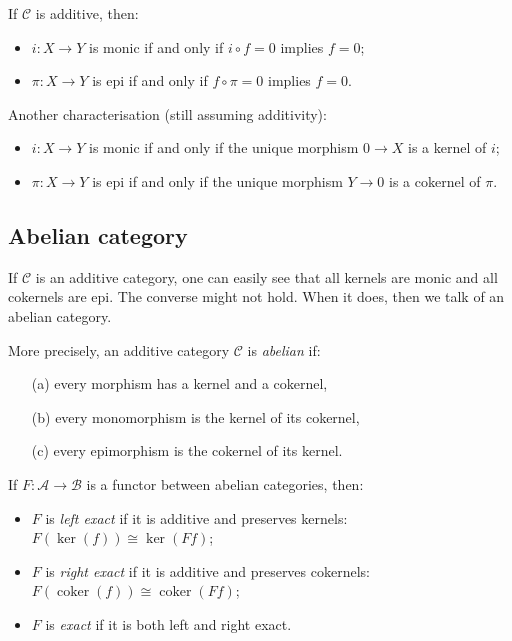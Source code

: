 \documentclass[11pt]{article}
\theoremstyle{definition}
\begin{document}
If \( \mathcal{C} \) is additive, then:
\begin{itemize}
  \item \( i: X \to Y \) is monic if and only if \( i \circ f = 0 \) implies \( f = 0 \);
  \item \( \pi: X \to Y \) is epi if and only if \( f \circ \pi = 0 \) implies \( f = 0 \).
\end{itemize}

Another characterisation (still assuming additivity):
\begin{itemize}
  \item \( i: X \to Y \) is monic if and only if the unique morphism \( 0 \to X \) is a kernel of \( i \);
  \item \( \pi: X \to Y \) is epi if and only if the unique morphism \( Y \to 0 \) is a cokernel of \( \pi \).
\end{itemize}

\subsection{Abelian category}

If \( \mathcal{C} \) is an additive category, one can easily see that all kernels are monic and all cokernels are epi. The
converse might not hold. When it does, then we talk of an abelian category.

More precisely, an additive category \( \mathcal{C} \) is \emph{abelian} if:
\begin{itemize}
  \item[(a)] every morphism has a kernel and a cokernel,
  \item[(b)] every monomorphism is the kernel of its cokernel,
  \item[(c)] every epimorphism is the cokernel of its kernel.
\end{itemize}

If \( F: \mathcal{A} \to \mathcal{B} \) is a functor between abelian categories, then:
\begin{itemize}
  \item \( F \) is \emph{left exact} if it is additive and preserves kernels: \( F(\ker(f)) \cong \ker(Ff) \);
  \item \( F \) is \emph{right exact} if it is additive and preserves cokernels: \( F(\operatorname{coker}(f)) \cong \operatorname{coker}(Ff) \);
  \item \( F \) is \emph{exact} if it is both left and right exact.
\end{itemize}
\end{document}
